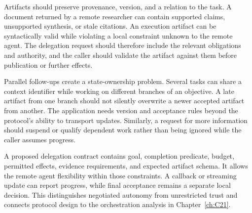 Artifacts should preserve provenance, version, and a relation to the task. A document returned by a remote researcher can contain supported claims, unsupported synthesis, or stale citations. An execution artifact can be syntactically valid while violating a local constraint unknown to the remote agent. The delegation request should therefore include the relevant obligations and authority, and the caller should validate the artifact against them before publication or further effects.

Parallel follow-ups create a state-ownership problem. Several tasks can share a context identifier while working on different branches of an objective. A late artifact from one branch should not silently overwrite a newer accepted artifact from another. The application needs version and acceptance rules beyond the protocol's ability to transport updates. Similarly, a request for more information should suspend or qualify dependent work rather than being ignored while the caller assumes progress.

A proposed delegation contract contains goal, completion predicate, budget, permitted effects, evidence requirements, and expected artifact schema. It allows the remote agent flexibility within those constraints. A callback or streaming update can report progress, while final acceptance remains a separate local decision. This distinguishes negotiated autonomy from unrestricted trust and connects protocol design to the orchestration analysis in Chapter~\ref{ch:C21}.

